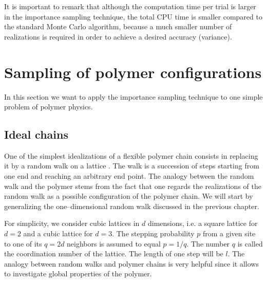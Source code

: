 It is important to remark that although the computation time per
trial is larger in the importance sampling technique, the total CPU 
time is smaller compared to the standard Monte Carlo algorithm,
because a much smaller number of realizations is required in order
to achieve a desired accuracy (variance).

\section{Sampling of polymer configurations}
In this section we want to apply the importance sampling technique
to one simple problem of polymer physics. 
\subsection{Ideal chains}
One of the simplest idealizations of a flexible polymer chain 
consists in replacing it by a random walk on a lattice 
\cite{DE_GENNES,DOI_AND_EDWARDS}. The walk 
is a succession of steps starting from one end and reaching an 
arbitrary end point. The analogy between the random walk and the
polymer stems from the fact that one regards the realizations of 
the random walk as a possible configuration of the polymer chain.
We will start by generalizing the one--dimensional random walk
discussed in the previous chapter.

For simplicity, we consider cubic lattices in $d$ dimensions,
i.e. a square lattice for $d=2$ and a cubic lattice for $d=3$.
The stepping probability $p$ from a given site to one of its $q=2d$
neighbors  is assumed to equal $p=1/q$. The number $q$ is called
the coordination number of the lattice. The length of one step
will be $l$. The analogy between random walks and polymer chains 
is very helpful since it allows to investigate global properties 
of the polymer.

